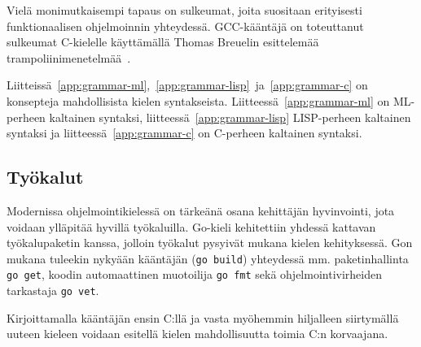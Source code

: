 Vielä monimutkaisempi tapaus on sulkeumat, joita suositaan erityisesti
funktionaalisen ohjelmoinnin yhteydessä. GCC-kääntäjä on toteuttanut sulkeumat
C-kielelle käyttämällä Thomas Breuelin esittelemää
trampoliinimenetelmää~\citep{gccnested, cppclosure}.

Liitteissä~\ref{app:grammar-ml},~\ref{app:grammar-lisp}~ja~\ref{app:grammar-c}
on konsepteja mahdollisista kielen syntakseista.
Liitteessä~\ref{app:grammar-ml} on ML-perheen kaltainen syntaksi,
liitteessä~\ref{app:grammar-lisp} LISP-perheen kaltainen syntaksi ja
liitteessä~\ref{app:grammar-c} on C-perheen kaltainen syntaksi.

\subsection{Työkalut}

Modernissa ohjelmointikielessä on tärkeänä osana kehittäjän hyvinvointi, jota
voidaan ylläpitää hyvillä työkaluilla. Go-kieli kehitettiin yhdessä kattavan
työkalupaketin kanssa, jolloin työkalut pysyivät mukana kielen kehityksessä.
Gon mukana tuleekin nykyään kääntäjän (\texttt{go build}) yhteydessä mm.
paketinhallinta \texttt{go get}, koodin automaattinen muotoilija \texttt{go
fmt} sekä ohjelmointivirheiden tarkastaja \texttt{go vet}. 

Kirjoittamalla kääntäjän ensin C:llä ja vasta myöhemmin hiljalleen siirtymällä
uuteen kieleen voidaan esitellä kielen mahdollisuutta toimia C:n korvaajana.
